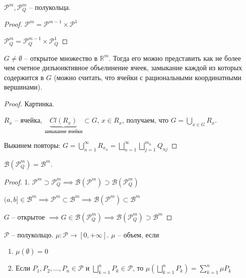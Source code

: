 \begin{theorem}
    $\mathcal{P}^m, \mathcal{P}^m_Q$ -- полукольца.
\end{theorem}
\begin{proof}
    $\mathcal{P}^m = \mathcal{P}^{m-1} \times \mathcal{P}^1$

    $\mathcal{P}_Q^m = \mathcal{P}_Q^{m-1} \times \mathcal{P}_Q^1$
\end{proof}

\begin{theorem}
    $G \neq \emptyset$ -- открытое множество в $\mathbb{R}^m$. Тогда его можно представить как не более чем счетное дизъюнктивное объелинение ячеек, замыкание каждой из которых содержится в $G$ (можно считать, что ячейки с рациональными координатными вершинами).
\end{theorem}
\begin{proof}
    Картинка.

    $R_x$ -- ячейка, $\underbrace{Cl  (R_x)}_{\text{замыкание ячейки}} \subset G$, $x \in R_x$, получаем, что $G = \bigcup_{x \in G} R_x$.

    Выкинем повторы: $G = \bigcup_{n=1}^{\infty} R_{x_n} = \bigsqcup_{n=1}^{\infty} \bigsqcup_{j=1}^{m_n} Q_{nj}$
\end{proof}

\begin{consequence}
    $\mathcal{B}(\mathcal{P}^m_Q) = \mathcal{B}^m$.
\end{consequence}
\begin{proof}
    
    1. $\mathcal{P}^m \supset \mathcal{P}^m_Q \implies \mathcal{B}(\mathcal{P}^m) \supset \mathcal{B}(\mathcal{P}_Q^m)$

    $(a, b] \in \mathcal{B}^m \implies \mathcal{P}^m \subset \mathcal{B}^m \implies \mathcal{B}(\mathcal{P}^m) \subset \mathcal{B}^m$

    $G$ -- открытое $\implies G \in \mathcal{B}(\mathcal{P}_Q^m) \implies \mathcal{B}(\mathcal{P}^m_Q) \supset \mathcal{B}^m$
\end{proof}

\begin{definition}
    $\mathcal{P}$ -- полукольцо. $\mu: \mathcal{P} \rightarrow [0, +\infty]$. $\mu$ -- объем, если 

    \begin{enumerate}
        \item $\mu(\emptyset) = 0$
        \item Если $P_1, P_2, \dots, P_n \in \mathcal{P}$ и $\bigsqcup_{k=1}^n P_k \in \mathcal{P}$, то $\mu \left(\bigsqcup_{k=1}^n P_k\right) = \sum_{k=1}^{n} \mu P_k$ 
    \end{enumerate}
\end{definition}

